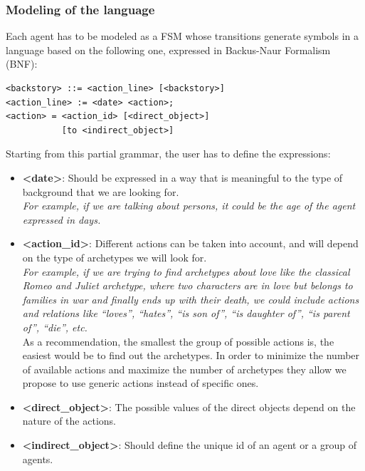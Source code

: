 \documentclass{sig-alternate}
\begin{document}
\subsubsection{Modeling of the language}

Each agent has to be modeled as a FSM whose transitions generate symbols in a language based on the following one, expressed in Backus-Naur Formalism (BNF):

\begin{verbatim}
<backstory> ::= <action_line> [<backstory>]
<action_line> := <date> <action>;
<action> = <action_id> [<direct_object>]
           [to <indirect_object>]
\end{verbatim}

Starting from this partial grammar, the user has to define the expressions:
\begin{itemize}
\item \textbf{<date>}: Should be expressed in a way that is meaningful to the type of background that we are looking for.\\
\textit{For example, if we are talking about persons, it could be the age of the agent expressed in days.}

\item \textbf{<action\_id>}: Different actions can be taken into account, and will depend on the type of archetypes we will look for.\\

\textit{For example, if we are trying to find archetypes about love like the classical Romeo and Juliet archetype, where two characters are in love but belongs to families in war and finally ends up with their death, we could include actions and relations like ``loves'', ``hates'', ``is son of'', ``is daughter of'', ``is parent of'', ``die'', etc.}\\

As a recommendation, the smallest the group of possible actions is, the easiest would be to find out the archetypes. In order to minimize the number of available actions and maximize the number of archetypes they allow we propose to use generic actions instead of specific ones.

\item \textbf{<direct\_object>}: The possible values of the direct objects depend on the nature of the actions.

\item \textbf{<indirect\_object>}: Should define the unique id of an agent or a group of agents.

\end{itemize}
\end{document}
